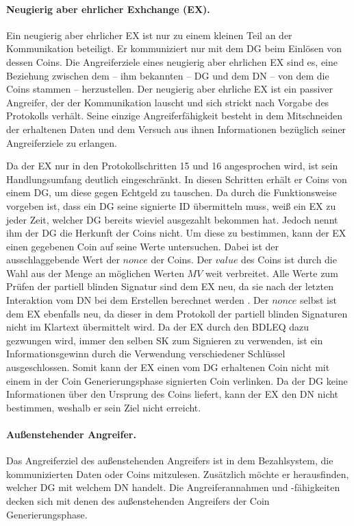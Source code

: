 \documentclass[
	fontsize=11pt,
	headings=small,
	parskip=half,           %
	bibliography=totoc,
	numbers=noenddot,       %
	open=any,               %
]{scrreprt}
\begin{document}
\paragraph{Neugierig aber ehrlicher Exhchange (EX).}
Ein neugierig aber ehrlicher EX ist nur zu einem kleinen Teil an der Kommunikation beteiligt. Er kommuniziert nur mit dem DG beim Einlösen von dessen Coins. Die Angreiferziele eines neugierig aber ehrlichen EX sind es, eine Beziehung zwischen dem -- ihm bekannten -- DG und dem DN -- von dem die Coins stammen -- herzustellen. Der neugierig aber ehrliche EX ist ein passiver Angreifer, der der Kommunikation lauscht und sich strickt nach Vorgabe des Protokolls verhält. Seine einzige Angreiferfähigkeit besteht in dem Mitschneiden der erhaltenen Daten und dem Versuch aus ihnen Informationen bezüglich seiner Angreiferziele zu erlangen.

Da der EX nur in den Protokollschritten 15 und 16 angesprochen wird, ist sein Handlungsumfang deutlich eingeschränkt. In diesen Schritten erhält er Coins von einem DG, um diese gegen Echtgeld zu tauschen. Da durch die Funktionsweise vorgeben ist, dass ein DG seine signierte ID übermitteln muss, weiß ein EX zu jeder Zeit, welcher DG bereits wieviel ausgezahlt bekommen hat. Jedoch nennt ihm der DG die Herkunft der Coins nicht. Um diese zu bestimmen, kann der EX einen gegebenen Coin auf seine Werte untersuchen. Dabei ist der ausschlaggebende Wert der $nonce$ der Coins. Der $value$ des Coins ist durch die Wahl aus der Menge an möglichen Werten $MV$ weit verbreitet. Alle Werte zum Prüfen der partiell blinden Signatur sind dem EX neu, da sie nach der letzten Interaktion vom DN bei dem Erstellen berechnet werden \cite{abe2000provably}. Der $nonce$ selbst ist dem EX ebenfalls neu, da dieser in dem Protokoll der partiell blinden Signaturen nicht im Klartext übermittelt wird. Da der EX durch den BDLEQ dazu gezwungen wird, immer den selben SK zum Signieren zu verwenden, ist ein Informationsgewinn durch die Verwendung verschiedener Schlüssel ausgeschlossen. Somit kann der EX einen vom DG erhaltenen Coin nicht mit einem in der Coin Generierungsphase signierten Coin verlinken. Da der DG keine Informationen über den Ursprung des Coins liefert, kann der EX den DN nicht bestimmen, weshalb er sein Ziel nicht erreicht. 

\paragraph{Außenstehender Angreifer.}
Das Angreiferziel des außenstehenden Angreifers ist in dem Bezahlsystem, die kommunizierten Daten oder Coins mitzulesen. Zusätzlich möchte er herausfinden, welcher DG mit welchem DN handelt. Die Angreiferannahmen und -fähigkeiten decken sich mit denen des außenstehenden Angreifers der Coin Generierungsphase.
\end{document}
